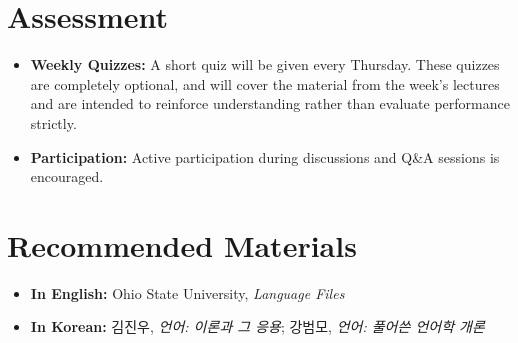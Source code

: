 \documentclass[12pt,oneside,a4paper]{oblivoir}
\begin{document}
\section*{Assessment}
\begin{itemize}
    \item \textbf{Weekly Quizzes:} A short quiz will be given every Thursday. These quizzes are completely optional, and will cover the material from the week's lectures and are intended to reinforce understanding rather than evaluate performance strictly.
    \item \textbf{Participation:} Active participation during discussions and Q\&A sessions is encouraged.
\end{itemize}

\section*{Recommended Materials}

\begin{itemize}
\item \textbf{In English:} Ohio State University, \textit{Language Files}
\item \textbf{In Korean:} 김진우, \textit{언어: 이론과 그 응용}; 강범모, \textit{언어: 풀어쓴 언어학 개론}

\end{itemize}
\end{document}
